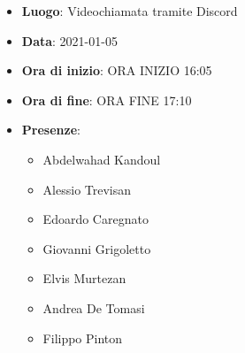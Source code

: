 \begin{itemize}
    \item \textbf{Luogo}: Videochiamata tramite Discord
    \item \textbf{Data}: 2021-01-05
    \item \textbf{Ora di inizio}: ORA INIZIO 16:05
    \item \textbf{Ora di fine}: ORA FINE 17:10
    \item \textbf{Presenze}:
          \begin{itemize}
            \item Abdelwahad Kandoul
            \item Alessio Trevisan
            \item Edoardo Caregnato
            \item Giovanni Grigoletto
            \item Elvis Murtezan
            \item Andrea De Tomasi
            \item Filippo Pinton
          \end{itemize}
\end{itemize}
